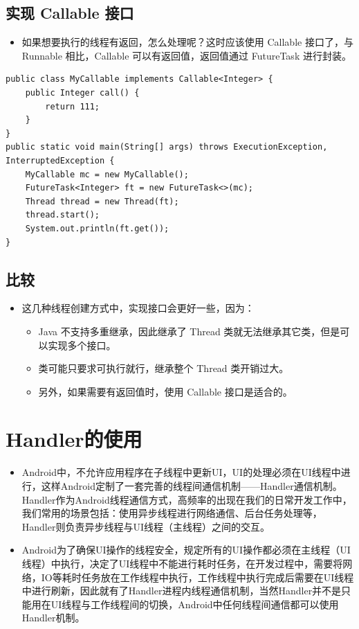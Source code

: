 \documentclass[9pt, b5paper]{article}
\begin{document}
\subsection{实现 Callable 接口}
\label{sec-1-3}
\begin{itemize}
\item 如果想要执行的线程有返回，怎么处理呢？这时应该使用 Callable 接口了，与 Runnable 相比，Callable 可以有返回值，返回值通过 FutureTask 进行封装。
\end{itemize}
\begin{verbatim}
public class MyCallable implements Callable<Integer> {
    public Integer call() {
        return 111;
    }
}
public static void main(String[] args) throws ExecutionException, InterruptedException {
    MyCallable mc = new MyCallable();
    FutureTask<Integer> ft = new FutureTask<>(mc);
    Thread thread = new Thread(ft);
    thread.start();
    System.out.println(ft.get());
}
\end{verbatim}
\subsection{比较}
\label{sec-1-4}
\begin{itemize}
\item 这几种线程创建方式中，实现接口会更好一些，因为：
\begin{itemize}
\item Java 不支持多重继承，因此继承了 Thread 类就无法继承其它类，但是可以实现多个接口。
\item 类可能只要求可执行就行，继承整个 Thread 类开销过大。
\item 另外，如果需要有返回值时，使用 Callable 接口是适合的。
\end{itemize}
\end{itemize}


\section{Handler的使用}
\label{sec-2}
\begin{itemize}
\item Android中，不允许应用程序在子线程中更新UI，UI的处理必须在UI线程中进行，这样Android定制了一套完善的线程间通信机制——Handler通信机制。Handler作为Android线程通信方式，高频率的出现在我们的日常开发工作中，我们常用的场景包括：使用异步线程进行网络通信、后台任务处理等，Handler则负责异步线程与UI线程（主线程）之间的交互。
\item Android为了确保UI操作的线程安全，规定所有的UI操作都必须在主线程（UI线程）中执行，决定了UI线程中不能进行耗时任务，在开发过程中，需要将网络，IO等耗时任务放在工作线程中执行，工作线程中执行完成后需要在UI线程中进行刷新，因此就有了Handler进程内线程通信机制，当然Handler并不是只能用在UI线程与工作线程间的切换，Android中任何线程间通信都可以使用Handler机制。
\end{itemize}
\end{document}
